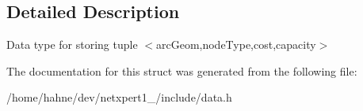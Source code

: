 \subsection{Detailed Description}
Data type for storing tuple $<$arc\+Geom,node\+Type,cost,capacity$>$ 

The documentation for this struct was generated from the following file\+:\begin{DoxyCompactItemize}
\item 
/home/hahne/dev/netxpert1\+\_/include/data.\+h\end{DoxyCompactItemize}
